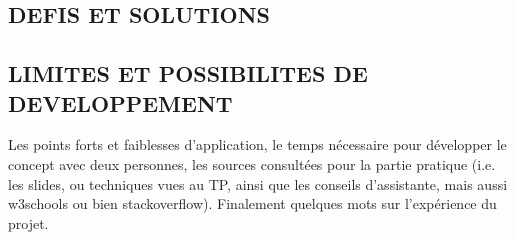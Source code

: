 \documentclass[a4paper,12pt]{article}
\begin{document}
\subsection {DEFIS ET SOLUTIONS}
\subsection {LIMITES ET POSSIBILITES DE DEVELOPPEMENT}
Les points forts et faiblesses d’application, le temps nécessaire pour développer le concept avec deux personnes, les sources consultées pour la partie pratique (i.e. les slides, ou techniques vues au TP, ainsi que les conseils d’assistante, mais aussi w3schools ou bien stackoverflow).
Finalement quelques mots sur l'expérience du projet.




\newpage

%
%

\end{document}
